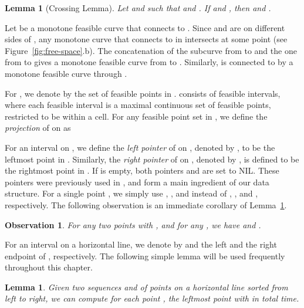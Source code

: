 \documentclass[12pt]{dalthesis}
\def\favoritefont{\bfseries \sffamily}
\def\QED{\ensuremath{{\Box}}}
\def\markatright#1{\leavevmode\unskip\nobreak\quad\hspace*{\fill}{#1}}
\newenvironment{proof}
	{\begin{trivlist}\item[\hskip\labelsep{\favoritefont Proof:}]}
	{\markatright{\QED}\end{trivlist}}
\newtheorem{lemma}[theorem]{Lemma}
\newtheorem{obs}{Observation}
\newcommand{\qed}{}
\newcommand{\REM}[1]{}
\begin{document}
\begin{lemma}[Crossing Lemma] \label{lemma:cross}
	Let  and   such that  and .
	If  and , then  and .
\end{lemma}

\begin{proof}
	Let  be a monotone feasible curve that connects  to . 
	Since  and  are on different sides of ,
	any monotone curve that connects  to  in 
	intersects  at some point  (see Figure~\ref{fig:free-space}.b).
	The concatenation of the subcurve from  to  
	and the one from  to  gives a monotone feasible curve from 
	 to . Similarly,  is connected to  by a monotone feasible curve through .
	\qed
\end{proof}

\REM{
\begin{figure}[t]
	\centering
	\texttt{[image: figs/cross]}
	\caption{Crossing Lemma.}
	\label{fig:cross}
\end{figure}
}

For , we denote by  the set of feasible points in . 
 consists of  feasible intervals,
where each feasible interval is a maximal continuous set of feasible points,
restricted to be within a cell.
For any feasible point set  in ,
we define the \emph{projection} of  on  as


For an interval  on ,
we define the \emph{left pointer} of  on  ,
denoted by , to be the leftmost point in .
Similarly, the \emph{right pointer} of  on , denoted by ,
is defined to be the rightmost point in .
If  is empty, both pointers  and  are set to NIL.
These pointers were previously used in \cite{AltERW03a,AltG95},
and form a main ingredient of our data structure.
For a single point , we simply use , , and 
instead of , , and , respectively. 
The following observation is an immediate corollary of Lemma~\ref{lemma:cross}.

\begin{obs} \label{obs:sorted}
	For any two points  with , and for any ,
	we have  and .	
\end{obs}


For an interval  on a horizontal line, we denote by  and  
the left and the right endpoint of , respectively.
The following simple lemma 
will be used frequently throughout this chapter.


\begin{lemma} \label{lemma:scan}
	Given two sequences  and  of points on a horizontal line sorted from left to right, 
	we can compute for each point ,  
	the leftmost point  with 
	in  total time.
\end{lemma}
\end{document}
